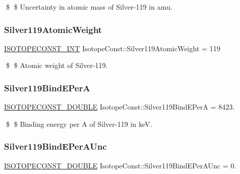 \$ \$ Uncertainty in atomic mass of Silver-\/119 in amu. \mbox{\label{group___isotope_const-_silver-_ag119_gaa0611a09c3b16231bf030c09c1794661}} 
\subsubsection{\texorpdfstring{Silver119\+Atomic\+Weight}{Silver119AtomicWeight}}
{\footnotesize\ttfamily \mbox{\hyperlink{group___isotope_const-_macros_ga5f18360b3e99483a35c32d789e62621c}{I\+S\+O\+T\+O\+P\+E\+C\+O\+N\+S\+T\+\_\+\+I\+NT}} Isotope\+Const\+::\+Silver119\+Atomic\+Weight = 119}

\$ \$ Atomic weight of Silver-\/119. \mbox{\label{group___isotope_const-_silver-_ag119_ga704dcc3957763736c3de549693d3021f}} 
\subsubsection{\texorpdfstring{Silver119\+Bind\+E\+PerA}{Silver119BindEPerA}}
{\footnotesize\ttfamily \mbox{\hyperlink{group___isotope_const-_macros_ga8f45a7272ce02c0b4c65c44636ed719a}{I\+S\+O\+T\+O\+P\+E\+C\+O\+N\+S\+T\+\_\+\+D\+O\+U\+B\+LE}} Isotope\+Const\+::\+Silver119\+Bind\+E\+PerA = 8423.}

\$ \$ Binding energy per A of Silver-\/119 in keV. \mbox{\label{group___isotope_const-_silver-_ag119_ga3178c50905dec18576e2ad39c1b55a48}} 
\subsubsection{\texorpdfstring{Silver119\+Bind\+E\+Per\+A\+Unc}{Silver119BindEPerAUnc}}
{\footnotesize\ttfamily \mbox{\hyperlink{group___isotope_const-_macros_ga8f45a7272ce02c0b4c65c44636ed719a}{I\+S\+O\+T\+O\+P\+E\+C\+O\+N\+S\+T\+\_\+\+D\+O\+U\+B\+LE}} Isotope\+Const\+::\+Silver119\+Bind\+E\+Per\+A\+Unc = 0.}

